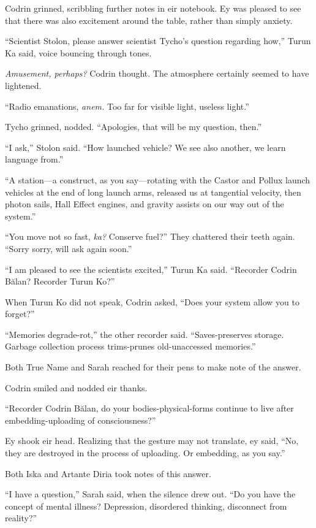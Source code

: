 Codrin grinned, scribbling further notes in eir notebook. Ey was pleased to see that there was also excitement around the table, rather than simply anxiety.

``Scientist Stolon, please answer scientist Tycho's question regarding how,'' Turun Ka said, voice bouncing through tones.

\emph{Amusement, perhaps?} Codrin thought. The atmosphere certainly seemed to have lightened.

``Radio emanations, \emph{anem.} Too far for visible light, useless light.''

Tycho grinned, nodded. ``Apologies, that will be my question, then.''

``I ask,'' Stolon said. ``How launched vehicle? We see also another, we learn language from.''

``A station—a construct, as you say—rotating with the Castor and Pollux launch vehicles at the end of long launch arms, released us at tangential velocity, then photon sails, Hall Effect engines, and gravity assists on our way out of the system.''

``You move not so fast, \emph{ka?} Conserve fuel?'' They chattered their teeth again. ``Sorry sorry, will ask again soon.''

``I am pleased to see the scientists excited,'' Turun Ka said. ``Recorder Codrin Bălan? Recorder Turun Ko?''

When Turun Ko did not speak, Codrin asked, ``Does your system allow you to forget?''

``Memories degrade-rot,'' the other recorder said. ``Saves-preserves storage. Garbage collection process trims-prunes old-unaccessed memories.''

Both True Name and Sarah reached for their pens to make note of the answer.

Codrin smiled and nodded eir thanks.

``Recorder Codrin Bălan, do your bodies-physical-forms continue to live after embedding-uploading of consciousness?''

Ey shook eir head. Realizing that the gesture may not translate, ey said, ``No, they are destroyed in the process of uploading. Or embedding, as you say.''

Both Iska and Artante Diria took notes of this answer.

``I have a question,'' Sarah said, when the silence drew out. ``Do you have the concept of mental illness? Depression, disordered thinking, disconnect from reality?''


